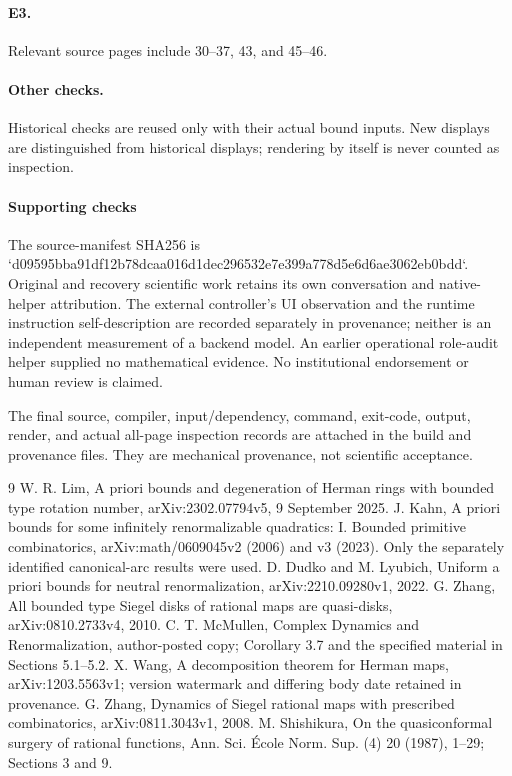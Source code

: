 \documentclass[10pt]{article}
\begin{document}
\paragraph*{E3.}\mbox{}\par
Relevant source pages include 30–37, 43, and 45–46.\par
\paragraph*{Other checks.}\mbox{}\par
Historical checks are reused only with their actual bound inputs. New displays are distinguished from historical displays; rendering by itself is never counted as inspection.\par
\paragraph*{Supporting checks}\mbox{}\par
The source-manifest SHA256 is `d09595bba91df12b78dcaa016d1dec296532e7e399a778d5e6d6ae3062eb0bdd`. Original and recovery scientific work retains its own conversation and native-helper attribution. The external controller’s UI observation and the runtime instruction self-description are recorded separately in provenance; neither is an independent measurement of a backend model. An earlier operational role-audit helper supplied no mathematical evidence. No institutional endorsement or human review is claimed.\par
The final source, compiler, input/dependency, command, exit-code, output, render, and actual all-page inspection records are attached in the build and provenance files. They are mechanical provenance, not scientific acceptance.\par
9 W. R. Lim, A priori bounds and degeneration of Herman rings with bounded type rotation number, arXiv:2302.07794v5, 9 September 2025. J. Kahn, A priori bounds for some infinitely renormalizable quadratics: I. Bounded primitive combinatorics, arXiv:math/0609045v2 (2006) and v3 (2023). Only the separately identified canonical-arc results were used. D. Dudko and M. Lyubich, Uniform a priori bounds for neutral renormalization, arXiv:2210.09280v1, 2022. G. Zhang, All bounded type Siegel disks of rational maps are quasi-disks, arXiv:0810.2733v4, 2010. C. T. McMullen, Complex Dynamics and Renormalization, author-posted copy; Corollary 3.7 and the specified material in Sections 5.1–5.2. X. Wang, A decomposition theorem for Herman maps, arXiv:1203.5563v1; version watermark and differing body date retained in provenance. G. Zhang, Dynamics of Siegel rational maps with prescribed combinatorics, arXiv:0811.3043v1, 2008. M. Shishikura, On the quasiconformal surgery of rational functions, Ann. Sci. École Norm. Sup. (4) 20 (1987), 1–29; Sections 3 and 9.\par
\end{document}
